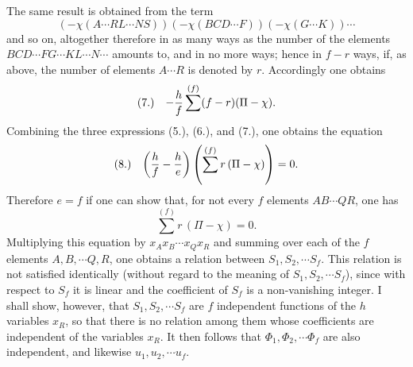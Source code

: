 \documentclass[11pt]{article}
\makeatletter
\newcommand{\frobtagc}[2]{\[\begin{array}{@{}r@{\quad}c@{}}\textup{(#1)} & \displaystyle #2\end{array}\]}
\makeatother
\begin{document}
The same result is obtained from the term
\[
(-\chi(A\cdots RL\cdots NS))(-\chi(BCD\cdots F))(-\chi(G\cdots K))\cdots
\]
and so on, altogether therefore in as many ways as the number of the elements $BCD\cdots\allowbreak FG\cdots\allowbreak KL\cdots\allowbreak N\cdots$ amounts to, and in no more ways; hence in $f-r$ ways, if, as above, the number of elements $A\cdots R$ is denoted by $r$. Accordingly one obtains
\frobtagc{7.}{-\frac{h}{f}\sum^{(f)}(f-r)(\Pi-\chi).}
Combining the three expressions (5.), (6.), and (7.), one obtains the equation
\frobtagc{8.}{\left(\frac{h}{f}-\frac{h}{e}\right)\left(\sum^{(f)}r\,(\Pi-\chi)\right)=0.}
Therefore $e=f$ if one can show that, for not every $f$ elements $AB\cdots QR$, one has
\[
\sum^{(f)}r\,(\Pi-\chi)=0.
\]
Multiplying this equation by $x_Ax_B\cdots x_Qx_R$ and summing over each of the $f$ elements $A,B,\cdots Q,R$, one obtains a relation between $S_1,S_2,\cdots S_f$. This relation is not satisfied identically (without regard to the meaning of $S_1,S_2,\cdots S_f$), since with respect to $S_f$ it is linear and the coefficient of $S_f$ is a non-vanishing integer. I shall show, however, that $S_1,S_2,\cdots S_f$ are $f$ independent functions of the $h$ variables $x_R$, so that there is no relation among them whose coefficients are independent of the variables $x_R$. It then follows that $\Phi_1,\Phi_2,\cdots\Phi_f$ are also independent, and likewise $u_1,u_2,\cdots u_f$.
\end{document}
